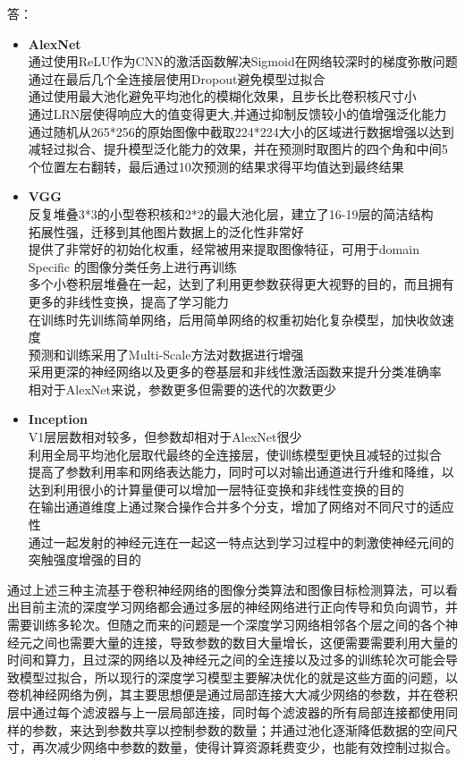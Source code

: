 \documentclass{homework}
\begin{document}
\normalsize
答：
\begin{itemize}
	\item \textbf{AlexNet} \\
	通过使用ReLU作为CNN的激活函数解决Sigmoid在网络较深时的梯度弥散问题\\ 
	通过在最后几个全连接层使用Dropout避免模型过拟合\\ 
	通过使用最大池化避免平均池化的模糊化效果，且步长比卷积核尺寸小\\ 
	通过LRN层使得响应大的值变得更大,并通过抑制反馈较小的值增强泛化能力\\ 
	通过随机从265*256的原始图像中截取224*224大小的区域进行数据增强以达到减轻过拟合、提升模型泛化能力的效果，并在预测时取图片的四个角和中间5个位置左右翻转，最后通过10次预测的结果求得平均值达到最终结果
	\item \textbf{VGG} \\ 
	反复堆叠3*3的小型卷积核和2*2的最大池化层，建立了16-19层的简洁结构\\
	拓展性强，迁移到其他图片数据上的泛化性非常好\\ 
	提供了非常好的初始化权重，经常被用来提取图像特征，可用于domain Specific 的图像分类任务上进行再训练\\ 
	多个小卷积层堆叠在一起，达到了利用更参数获得更大视野的目的，而且拥有更多的非线性变换，提高了学习能力\\ 
	在训练时先训练简单网络，后用简单网络的权重初始化复杂模型，加快收敛速度\\ 
	预测和训练采用了Multi-Scale方法对数据进行增强\\ 
	采用更深的神经网络以及更多的卷基层和非线性激活函数来提升分类准确率\\ 
	相对于AlexNet来说，参数更多但需要的迭代的次数更少
	\item \textbf{Inception} \\ 
	V1层层数相对较多，但参数却相对于AlexNet很少\\ 
	利用全局平均池化层取代最终的全连接层，使训练模型更快且减轻的过拟合\\ 
	提高了参数利用率和网络表达能力，同时可以对输出通道进行升维和降维，以达到利用很小的计算量便可以增加一层特征变换和非线性变换的目的\\ 
	在输出通道维度上通过聚合操作合并多个分支，增加了网络对不同尺寸的适应性\\ 
	通过一起发射的神经元连在一起这一特点达到学习过程中的刺激使神经元间的突触强度增强的目的
\end{itemize}
\par 通过上述三种主流基于卷积神经网络的图像分类算法和图像目标检测算法，可以看出目前主流的深度学习网络都会通过多层的神经网络进行正向传导和负向调节，并需要训练多轮次。但随之而来的问题是一个深度学习网络相邻各个层之间的各个神经元之间也需要大量的连接，导致参数的数目大量增长，这便需要需要利用大量的时间和算力，且过深的网络以及神经元之间的全连接以及过多的训练轮次可能会导致模型过拟合，所以现行的深度学习模型主要解决优化的就是这些方面的问题，以卷机神经网络为例，其主要思想便是通过局部连接大大减少网络的参数，并在卷积层中通过每个滤波器与上一层局部连接，同时每个滤波器的所有局部连接都使用同样的参数，来达到参数共享以控制参数的数量；并通过池化逐渐降低数据的空间尺寸，再次减少网络中参数的数量，使得计算资源耗费变少，也能有效控制过拟合。
\end{document}
